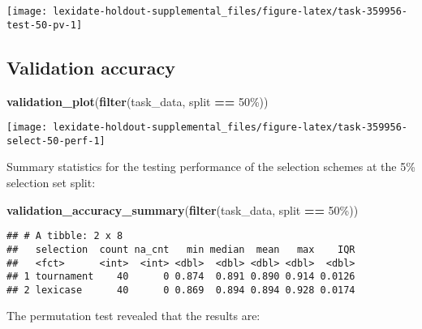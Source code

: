 \documentclass[
]{book}
\newenvironment{Shaded}{\begin{snugshade}}{\end{snugshade}}
\newcommand{\FunctionTok}[1]{\textcolor[rgb]{0.13,0.29,0.53}{\textbf{#1}}}
\newcommand{\NormalTok}[1]{#1}
\newcommand{\SpecialCharTok}[1]{\textcolor[rgb]{0.81,0.36,0.00}{\textbf{#1}}}
\newcommand{\StringTok}[1]{\textcolor[rgb]{0.31,0.60,0.02}{#1}}
\begin{document}
\texttt{[image: lexidate-holdout-supplemental\_files/figure-latex/task-359956-test-50-pv-1]}

\hypertarget{validation-accuracy-27}{%
\subsection{Validation accuracy}\label{validation-accuracy-27}}

\begin{Shaded}
\begin{Highlighting}[]
\FunctionTok{validation\_plot}\NormalTok{(}\FunctionTok{filter}\NormalTok{(task\_data, split }\SpecialCharTok{==} \StringTok{\textquotesingle{}50\%\textquotesingle{}}\NormalTok{))}
\end{Highlighting}
\end{Shaded}

\texttt{[image: lexidate-holdout-supplemental\_files/figure-latex/task-359956-select-50-perf-1]}

Summary statistics for the testing performance of the selection schemes at the 5\% selection set split:

\begin{Shaded}
\begin{Highlighting}[]
\FunctionTok{validation\_accuracy\_summary}\NormalTok{(}\FunctionTok{filter}\NormalTok{(task\_data, split }\SpecialCharTok{==} \StringTok{\textquotesingle{}50\%\textquotesingle{}}\NormalTok{))}
\end{Highlighting}
\end{Shaded}

\begin{verbatim}
## # A tibble: 2 x 8
##   selection  count na_cnt   min median  mean   max    IQR
##   <fct>      <int>  <int> <dbl>  <dbl> <dbl> <dbl>  <dbl>
## 1 tournament    40      0 0.874  0.891 0.890 0.914 0.0126
## 2 lexicase      40      0 0.869  0.894 0.894 0.928 0.0174
\end{verbatim}

The permutation test revealed that the results are:
\end{document}
